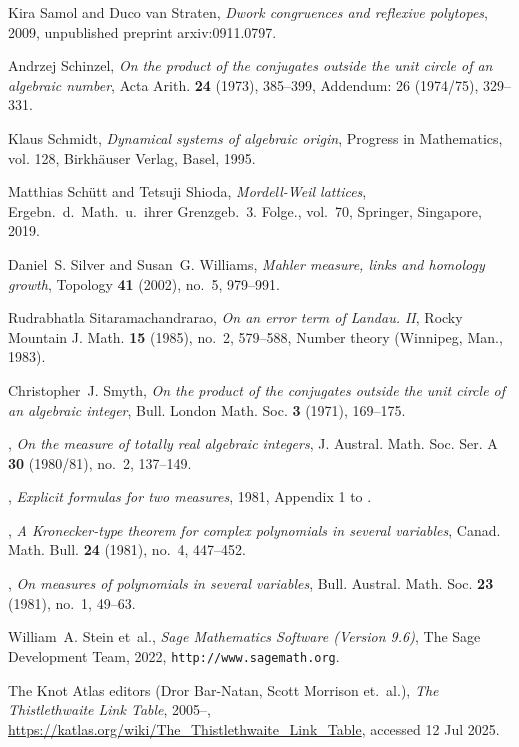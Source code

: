 \documentclass[12pt,reqno]{amsart}
\theoremstyle{definition}
\theoremstyle{plain}
\theoremstyle{definition}
\begin{document}
\begin{thebibliography}{100}
Kira Samol and Duco van Straten, \emph{Dwork congruences and reflexive
  polytopes}, 2009, unpublished preprint arxiv:0911.0797.

Andrzej Schinzel, \emph{On the product of the conjugates outside the unit
  circle of an algebraic number}, Acta Arith. \textbf{24} (1973), 385--399,
  Addendum: 26 (1974/75), 329--331.

Klaus Schmidt, \emph{Dynamical systems of algebraic origin}, Progress in
  Mathematics, vol. 128, Birkh\"{a}user Verlag, Basel, 1995.

Matthias Sch\"utt and Tetsuji Shioda, \emph{Mordell-{W}eil lattices}, Ergebn.\
  d.\ Math.\ u.\ ihrer Grenzgeb.\ 3. Folge., vol.~70, Springer, Singapore,
  2019.

Daniel~S. Silver and Susan~G. Williams, \emph{Mahler measure, links and
  homology growth}, Topology \textbf{41} (2002), no.~5, 979--991.

Rudrabhatla Sitaramachandrarao, \emph{On an error term of {L}andau. {II}},
  Rocky Mountain J. Math. \textbf{15} (1985), no.~2, 579--588, Number theory
  (Winnipeg, Man., 1983).

Christopher~J. Smyth, \emph{On the product of the conjugates outside the unit
  circle of an algebraic integer}, Bull. London Math. Soc. \textbf{3} (1971),
  169--175.

\bysame, \emph{On the measure of totally real algebraic integers}, J. Austral.
  Math. Soc. Ser. A \textbf{30} (1980/81), no.~2, 137--149.

\bysame, \emph{Explicit formulas for two measures}, 1981, Appendix 1 to
  \cite{Boyd-range}.

\bysame, \emph{A {K}ronecker-type theorem for complex polynomials in several
  variables}, Canad. Math. Bull. \textbf{24} (1981), no.~4, 447--452.

\bysame, \emph{On measures of polynomials in several variables}, Bull. Austral.
  Math. Soc. \textbf{23} (1981), no.~1, 49--63.

William~A. Stein et~al., \emph{{S}age {M}athematics {S}oftware ({V}ersion
  9.6)}, The Sage Development Team, 2022, {\tt http://www.sagemath.org}.

{The {K}not Atlas editors (Dror Bar-Natan, Scott Morrison et.~al.)}, \emph{The
  {T}histlethwaite {L}ink {T}able}, 2005--,
  \url{https://katlas.org/wiki/The_Thistlethwaite_Link_Table}, accessed 12 Jul
  2025.


\end{thebibliography}
\end{document}
